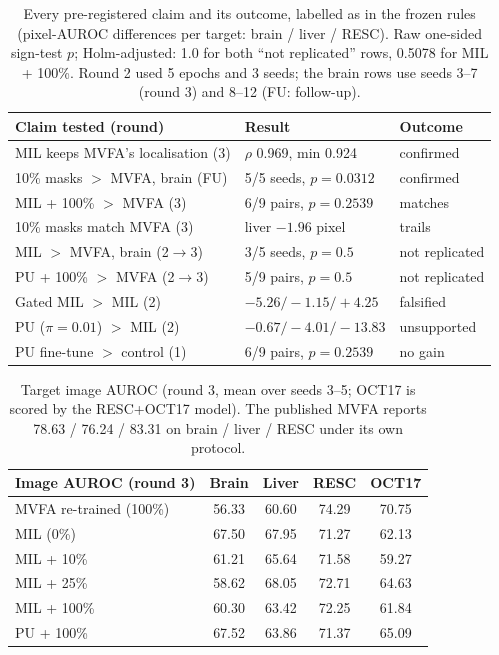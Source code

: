 \documentclass[10pt,twocolumn,letterpaper]{article}
\begin{document}
\begin{table}[t]
\centering
\scriptsize
\setlength{\tabcolsep}{2.5pt}
\begin{tabular}{@{}lll@{}}
\toprule
Claim tested (round) & Result & Outcome \\
\midrule
MIL keeps MVFA's localisation (3) & $\rho$ 0.969, min 0.924 & confirmed \\
10\% masks $>$ MVFA, brain (FU) & 5/5 seeds, $p=0.0312$ & confirmed \\
MIL + 100\% $>$ MVFA (3) & 6/9 pairs, $p=0.2539$ & matches \\
10\% masks match MVFA (3) & liver $-1.96$ pixel & trails \\
MIL $>$ MVFA, brain (2$\to$3) & 3/5 seeds, $p=0.5$ & not replicated \\
PU + 100\% $>$ MVFA (2$\to$3) & 5/9 pairs, $p=0.5$ & not replicated \\
Gated MIL $>$ MIL (2) & $-5.26/-1.15/+4.25$ & falsified \\
PU ($\pi=0.01$) $>$ MIL (2) & $-0.67/-4.01/-13.83$ & unsupported \\
PU fine-tune $>$ control (1) & 6/9 pairs, $p=0.2539$ & no gain \\
\bottomrule
\end{tabular}
\caption{Every pre-registered claim and its outcome, labelled as in the frozen rules (pixel-AUROC differences per target: brain / liver / RESC). Raw one-sided sign-test $p$; Holm-adjusted: 1.0 for both ``not replicated'' rows, 0.5078 for MIL + 100\%. Round 2 used 5 epochs and 3 seeds; the brain rows use seeds 3--7 (round 3) and 8--12 (FU: follow-up).}
\label{tab:record}
\end{table}

\begin{table}[t]
\centering
\scriptsize
\setlength{\tabcolsep}{4pt}
\begin{tabular}{@{}lcccc@{}}
\toprule
Image AUROC (round 3) & Brain & Liver & RESC & OCT17 \\
\midrule
MVFA re-trained (100\%) & 56.33 & 60.60 & 74.29 & 70.75 \\
MIL (0\%) & 67.50 & 67.95 & 71.27 & 62.13 \\
MIL + 10\% & 61.21 & 65.64 & 71.58 & 59.27 \\
MIL + 25\% & 58.62 & 68.05 & 72.71 & 64.63 \\
MIL + 100\% & 60.30 & 63.42 & 72.25 & 61.84 \\
PU + 100\% & 67.52 & 63.86 & 71.37 & 65.09 \\
\bottomrule
\end{tabular}
\caption{Target image AUROC (round 3, mean over seeds 3--5; OCT17 is scored by the RESC+OCT17 model). The published MVFA reports 78.63 / 76.24 / 83.31 on brain / liver / RESC under its own protocol.}
\label{tab:img}
\end{table}
\end{document}
